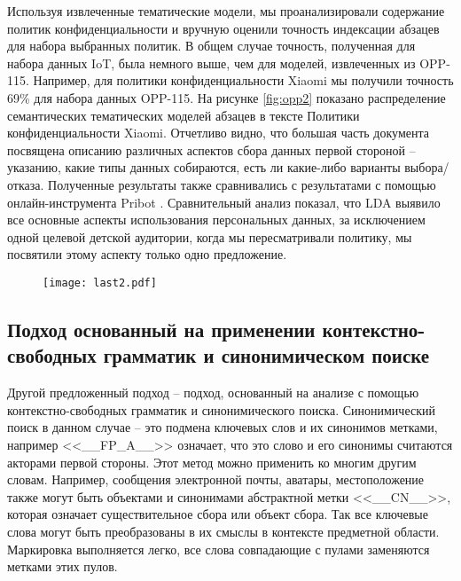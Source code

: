 \documentclass[../main]{subfiles}
\begin{document}
Используя извлеченные тематические модели, мы проанализировали содержание политик конфиденциальности и вручную оценили точность индексации абзацев для набора выбранных политик. В общем случае точность, полученная для набора данных IoT, была немного выше, чем для моделей, извлеченных из OPP-115. Например, для политики конфиденциальности Xiaomi \cite{MDPI14} мы получили точность 69\% для набора данных OPP-115. На рисунке \ref{fig:opp2} показано распределение семантических тематических моделей абзацев в тексте Политики конфиденциальности Xiaomi. Отчетливо видно, что большая часть документа посвящена описанию различных аспектов сбора данных первой стороной – указанию, какие типы данных собираются, есть ли какие-либо варианты выбора/отказа. Полученные результаты также сравнивались с результатами \cite{MDPI7} с помощью онлайн-инструмента Pribot \cite{Polisis}. Сравнительный анализ показал, что LDA выявило все основные аспекты использования персональных данных, за исключением одной целевой детской аудитории, когда мы пересматривали политику, мы посвятили этому аспекту только одно предложение.

\begin{figure}[H]
    \centering
    {\texttt{[image: last2.pdf]}}
    \vspace{-\baselineskip}
\end{figure}

\subsection{Подход основанный на применении контекстно-свободных грамматик и синонимическом поиске}

Другой предложенный подход -- подход, основанный на анализе с помощью контекстно-свободных грамматик и синонимического поиска. Синонимический поиск в данном случае -- это подмена ключевых слов и их синонимов метками, например <<\_\_FP\_A\_\_>> означает, что это слово и его синонимы считаются акторами первой стороны. Этот метод можно применить ко многим другим словам. Например, сообщения электронной почты, аватары, местоположение также могут быть объектами и синонимами абстрактной метки <<\_\_CN\_\_>>, которая означает существительное сбора или объект сбора. Так все ключевые слова могут быть преобразованы в их смыслы в контексте предметной области. Маркировка выполняется легко, все слова совпадающие с пулами заменяются метками этих пулов.
\end{document}
